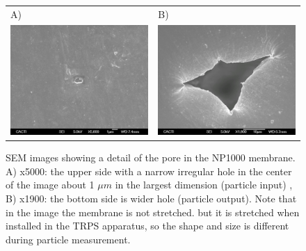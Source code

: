 \documentclass[journal=langd5,manuscript=article]{achemso}
\begin{document}
\begin{figure}
\begin{tabular}{|l|l|}
\hline
A) & B) \\
\includegraphics[width=0.5\linewidth]{Figures/NP1000-016.jpg}  &
\includegraphics[width=0.5\linewidth]{Figures/NP1000-021.jpg}  \\
\hline
\end{tabular}
\caption{SEM images showing a detail of the pore in the NP1000 membrane. A) x5000: the upper side with  a narrow irregular hole in the center of the image about 1 $\mu m$ in the largest dimension (particle input) , B) x1900: the bottom side is wider hole (particle output). Note that in the image the membrane is not stretched. but it is stretched when installed in the TRPS apparatus, so the shape and size is different during particle measurement.}
\label{fgr:NPmil}
\end{figure}
\end{document}
